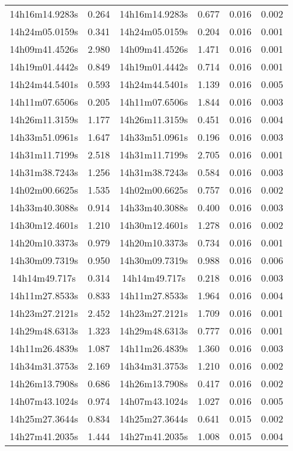 \begin{table}
\begin{tabular}{cccccc}
14h16m14.9283s & 0.264 & 14h16m14.9283s & 0.677 & 0.016 & 0.002 \\
14h24m05.0159s & 0.341 & 14h24m05.0159s & 0.204 & 0.016 & 0.001 \\
14h09m41.4526s & 2.980 & 14h09m41.4526s & 1.471 & 0.016 & 0.001 \\
14h19m01.4442s & 0.849 & 14h19m01.4442s & 0.714 & 0.016 & 0.001 \\
14h24m44.5401s & 0.593 & 14h24m44.5401s & 1.139 & 0.016 & 0.005 \\
14h11m07.6506s & 0.205 & 14h11m07.6506s & 1.844 & 0.016 & 0.003 \\
14h26m11.3159s & 1.177 & 14h26m11.3159s & 0.451 & 0.016 & 0.004 \\
14h33m51.0961s & 1.647 & 14h33m51.0961s & 0.196 & 0.016 & 0.003 \\
14h31m11.7199s & 2.518 & 14h31m11.7199s & 2.705 & 0.016 & 0.001 \\
14h31m38.7243s & 1.256 & 14h31m38.7243s & 0.584 & 0.016 & 0.003 \\
14h02m00.6625s & 1.535 & 14h02m00.6625s & 0.757 & 0.016 & 0.002 \\
14h33m40.3088s & 0.914 & 14h33m40.3088s & 0.400 & 0.016 & 0.003 \\
14h30m12.4601s & 1.210 & 14h30m12.4601s & 1.278 & 0.016 & 0.002 \\
14h20m10.3373s & 0.979 & 14h20m10.3373s & 0.734 & 0.016 & 0.001 \\
14h30m09.7319s & 0.950 & 14h30m09.7319s & 0.988 & 0.016 & 0.006 \\
14h14m49.717s & 0.314 & 14h14m49.717s & 0.218 & 0.016 & 0.003 \\
14h11m27.8533s & 0.833 & 14h11m27.8533s & 1.964 & 0.016 & 0.004 \\
14h23m27.2121s & 2.452 & 14h23m27.2121s & 1.709 & 0.016 & 0.001 \\
14h29m48.6313s & 1.323 & 14h29m48.6313s & 0.777 & 0.016 & 0.001 \\
14h11m26.4839s & 1.087 & 14h11m26.4839s & 1.360 & 0.016 & 0.003 \\
14h34m31.3753s & 2.169 & 14h34m31.3753s & 1.210 & 0.016 & 0.002 \\
14h26m13.7908s & 0.686 & 14h26m13.7908s & 0.417 & 0.016 & 0.002 \\
14h07m43.1024s & 0.974 & 14h07m43.1024s & 1.027 & 0.016 & 0.005 \\
14h25m27.3644s & 0.834 & 14h25m27.3644s & 0.641 & 0.015 & 0.002 \\
14h27m41.2035s & 1.444 & 14h27m41.2035s & 1.008 & 0.015 & 0.004 \\

\end{tabular}
\end{table}
